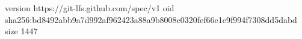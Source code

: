 version https://git-lfs.github.com/spec/v1
oid sha256:bd8492abb9a7d992af962423a88a9b8008c0320fef66e1e9f994f7308dd5dabd
size 1447
